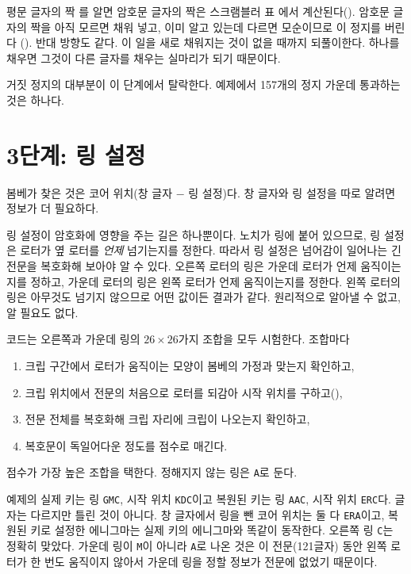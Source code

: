 평문 글자의 짝 를 알면 암호문 글자의 짝은 스크램블러 표 에서 계산된다().
암호문 글자의 짝을 아직 모르면 채워 넣고, 이미 알고 있는데 다르면 모순이므로 이 정지를 버린다
(). 반대 방향도 같다. 이 일을 새로 채워지는 것이 없을 때까지 되풀이한다. 하나를 채우면
그것이 다른 글자를 채우는 실마리가 되기 때문이다.

\Ours 거짓 정지의 대부분이 이 단계에서 탈락한다. 예제에서 157개의 정지 가운데 통과하는 것은 하나다.

\section{3단계: 링 설정}

봄베가 찾은 것은 코어 위치(창 글자 $-$ 링 설정)다. 창 글자와 링 설정을 따로 알려면 정보가 더 필요하다.

\Why 링 설정이 암호화에 영향을 주는 길은 하나뿐이다. 노치가 링에 붙어 있으므로, 링 설정은 로터가 옆 로터를
\emph{언제} 넘기는지를 정한다. 따라서 링 설정은 넘어감이 일어나는 긴 전문을 복호화해 보아야 알 수 있다.
오른쪽 로터의 링은 가운데 로터가 언제 움직이는지를 정하고, 가운데 로터의 링은 왼쪽 로터가 언제 움직이는지를
정한다. 왼쪽 로터의 링은 아무것도 넘기지 않으므로 어떤 값이든 결과가 같다. 원리적으로 알아낼 수 없고,
알 필요도 없다.

코드는 오른쪽과 가운데 링의 $26 \times 26$가지 조합을 모두 시험한다. 조합마다

\begin{enumerate}
\item 크립 구간에서 로터가 움직이는 모양이 봄베의 가정과 맞는지 확인하고,
\item 크립 위치에서 전문의 처음으로 로터를 되감아 시작 위치를 구하고(),
\item 전문 전체를 복호화해 크립 자리에 크립이 나오는지 확인하고,
\item 복호문이 독일어다운 정도를 점수로 매긴다.
\end{enumerate}

점수가 가장 높은 조합을 택한다. 정해지지 않는 링은 \texttt{A}로 둔다.

\Ours 예제의 실제 키는 링 \texttt{GMC}, 시작 위치 \texttt{KDC}이고 복원된 키는 링 \texttt{AAC}, 시작 위치
\texttt{ERC}다. 글자는 다르지만 틀린 것이 아니다. 창 글자에서 링을 뺀 코어 위치는 둘 다 \texttt{ERA}이고,
복원된 키로 설정한 에니그마는 실제 키의 에니그마와 똑같이 동작한다. 오른쪽 링 \texttt{C}는 정확히 맞았다.
가운데 링이 \texttt{M}이 아니라 \texttt{A}로 나온 것은 이 전문(121글자) 동안 왼쪽 로터가 한 번도 움직이지
않아서 가운데 링을 정할 정보가 전문에 없었기 때문이다.

